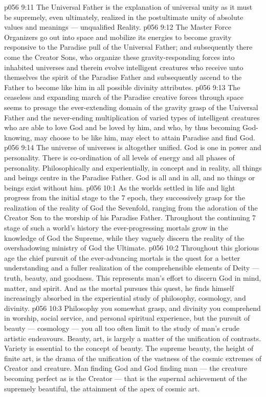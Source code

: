 \vs p056 9:11 The Universal Father is the explanation of universal unity as it must be supremely, even ultimately, realized in the postultimate unity of absolute values and meanings --- unqualified Reality.
\vs p056 9:12 The Master Force Organizers go out into space and mobilize its energies to become gravity responsive to the Paradise pull of the Universal Father; and subsequently there come the Creator Sons, who organize these gravity\hyp{}responding forces into inhabited universes and therein evolve intelligent creatures who receive unto themselves the spirit of the Paradise Father and subsequently ascend to the Father to become like him in all possible divinity attributes.
\vs p056 9:13 The ceaseless and expanding march of the Paradise creative forces through space seems to presage the ever\hyp{}extending domain of the gravity grasp of the Universal Father and the never\hyp{}ending multiplication of varied types of intelligent creatures who are able to love God and be loved by him, and who, by thus becoming God\hyp{}knowing, may choose to be like him, may elect to attain Paradise and find God.
\vs p056 9:14 The universe of universes is altogether unified. God is one in power and personality. There is co\hyp{}ordination of all levels of energy and all phases of personality. Philosophically and experientially, in concept and in reality, all things and beings centre in the Paradise Father. God is all and in all, and no things or beings exist without him.
\vs p056 10:1 As the worlds settled in life and light progress from the initial stage to the 7 epoch, they successively grasp for the realization of the reality of God the Sevenfold, ranging from the adoration of the Creator Son to the worship of his Paradise Father. Throughout the continuing 7 stage of such a world’s history the ever\hyp{}progressing mortals grow in the knowledge of God the Supreme, while they vaguely discern the reality of the overshadowing ministry of God the Ultimate.
\vs p056 10:2 Throughout this glorious age the chief pursuit of the ever\hyp{}advancing mortals is the quest for a better understanding and a fuller realization of the comprehensible elements of Deity --- truth, beauty, and goodness. This represents man’s effort to discern God in mind, matter, and spirit. And as the mortal pursues this quest, he finds himself increasingly absorbed in the experiential study of philosophy, cosmology, and divinity.
\vs p056 10:3 \pc Philosophy you somewhat grasp, and divinity you comprehend in worship, social service, and personal spiritual experience, but the pursuit of beauty --- cosmology --- you all too often limit to the study of man’s crude artistic endeavours. Beauty, art, is largely a matter of the unification of contrasts. Variety is essential to the concept of beauty. The supreme beauty, the height of finite art, is the drama of the unification of the vastness of the cosmic extremes of Creator and creature. Man finding God and God finding man --- the creature becoming perfect as is the Creator --- that is the supernal achievement of the supremely beautiful, the attainment of the apex of cosmic art.
